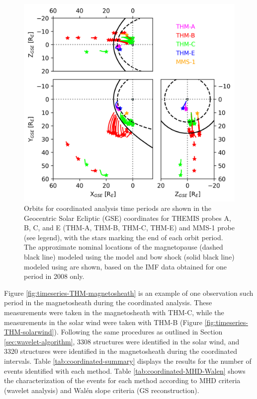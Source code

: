 \begin{figure}
    \centering
    \includegraphics[width=\textwidth]{Figures/Orbits/all_TE_orbits_xy_xz_yz_coordinated.png}
    \caption[Orbits for coordinated observation intervals]{Orbits for coordinated analysis time periods are shown in the Geocentric Solar Ecliptic (GSE) coordinates for THEMIS probes A, B, C, and E (THM-A, THM-B, THM-C, THM-E) and MMS-1 probe (see legend), with the stars marking the end of each orbit period. The approximate nominal locations of the magnetopause (dashed black line) modeled using the \cite{Shue:1997} model and bow shock (solid black line) modeled using \cite{SlavinHolzer:1984} are shown, based on the IMF data obtained for one period in 2008 only.}
    \label{fig:coordinated-orbits-plot}
\end{figure}

Figure \ref{fig:timeseries-THM-magnetosheath} is an example of one observation such period in the magnetosheath during the coordinated analysis. These measurements were taken in the magnetosheath with THM-C, while the measurements in the solar wind were taken with THM-B (Figure \ref{fig:timeseries-THM-solarwind}). Following the same procedures as outlined in Section \ref{sec:wavelet-algorithm}, 3308 structures were identified in the solar wind, and 3320 structures were identified in the magnetosheath during the coordinated intervals. Table \ref{tab:coordinated-summary} displays the results for the number of events identified with each method. Table \ref{tab:coordinated-MHD-Walen} shows the characterization of the events for each method according to MHD criteria (wavelet analysis) and Wal\'en slope criteria (GS reconstruction).

